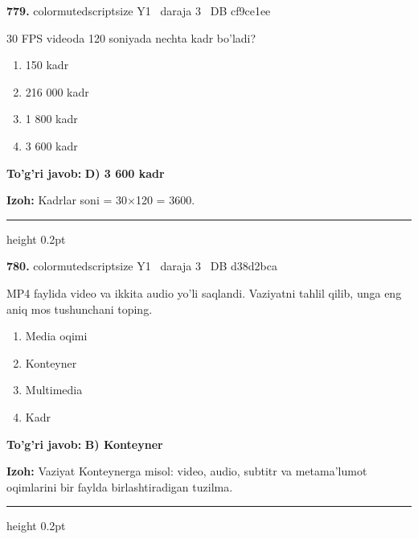 \documentclass[10pt,a4paper,oneside]{article}
\begin{document}
\noindent\textbf{\color{ink}779.}  {color{muted}scriptsize Y1 \textbullet\ daraja 3 \textbullet\ DB cf9ce1ee}
\par
30 FPS videoda 120 soniyada nechta kadr bo'ladi?
\begin{enumerate}[label=\Alph*),leftmargin=9mm]
\item 150 kadr
\item 216 000 kadr
\item 1 800 kadr
\item 3 600 kadr
\end{enumerate}
\begin{tcolorbox}[enhanced,breakable,colback=teal!4,colframe=teal!50!black,boxrule=0.5pt,arc=1.1mm,left=3mm,right=3mm,top=1.7mm,bottom=1.7mm,before skip=2mm,after skip=2mm]
\textbf{\color{teal}To'g'ri javob:} \textbf{D) 3 600 kadr}
\par\smallskip
\textbf{Izoh:} Kadrlar soni = 30\ensuremath{\times}120 = 3600.
\end{tcolorbox}
\vspace{2mm}\hrule height 0.2pt \vspace{3mm}

\noindent\textbf{\color{ink}780.}  {color{muted}scriptsize Y1 \textbullet\ daraja 3 \textbullet\ DB d38d2bca}
\par
MP4 faylida video va ikkita audio yo'li saqlandi. Vaziyatni tahlil qilib, unga eng aniq mos tushunchani toping.
\begin{enumerate}[label=\Alph*),leftmargin=9mm]
\item Media oqimi
\item Konteyner
\item Multimedia
\item Kadr
\end{enumerate}
\begin{tcolorbox}[enhanced,breakable,colback=teal!4,colframe=teal!50!black,boxrule=0.5pt,arc=1.1mm,left=3mm,right=3mm,top=1.7mm,bottom=1.7mm,before skip=2mm,after skip=2mm]
\textbf{\color{teal}To'g'ri javob:} \textbf{B) Konteyner}
\par\smallskip
\textbf{Izoh:} Vaziyat Konteynerga misol: video, audio, subtitr va metama'lumot oqimlarini bir faylda birlashtiradigan tuzilma.
\end{tcolorbox}
\vspace{2mm}\hrule height 0.2pt \vspace{3mm}
\end{document}
